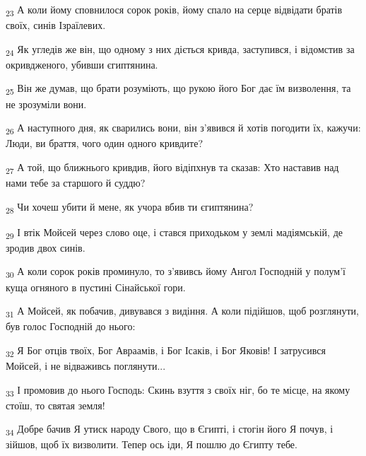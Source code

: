 \begin{tcolorbox}
\textsubscript{23} А коли йому сповнилося сорок років, йому спало на серце відвідати братів своїх, синів Ізраїлевих.
\end{tcolorbox}
\begin{tcolorbox}
\textsubscript{24} Як угледів же він, що одному з них діється кривда, заступився, і відомстив за окривдженого, убивши єгиптянина.
\end{tcolorbox}
\begin{tcolorbox}
\textsubscript{25} Він же думав, що брати розуміють, що рукою його Бог дає їм визволення, та не зрозуміли вони.
\end{tcolorbox}
\begin{tcolorbox}
\textsubscript{26} А наступного дня, як сварились вони, він з'явився й хотів погодити їх, кажучи: Люди, ви браття, чого один одного кривдите?
\end{tcolorbox}
\begin{tcolorbox}
\textsubscript{27} А той, що ближнього кривдив, його відіпхнув та сказав: Хто наставив над нами тебе за старшого й суддю?
\end{tcolorbox}
\begin{tcolorbox}
\textsubscript{28} Чи хочеш убити й мене, як учора вбив ти єгиптянина?
\end{tcolorbox}
\begin{tcolorbox}
\textsubscript{29} І втік Мойсей через слово оце, і стався приходьком у землі мадіямській, де зродив двох синів.
\end{tcolorbox}
\begin{tcolorbox}
\textsubscript{30} А коли сорок років проминуло, то з'явивсь йому Ангол Господній у полум'ї куща огняного в пустині Сінайської гори.
\end{tcolorbox}
\begin{tcolorbox}
\textsubscript{31} А Мойсей, як побачив, дивувався з видіння. А коли підійшов, щоб розглянути, був голос Господній до нього:
\end{tcolorbox}
\begin{tcolorbox}
\textsubscript{32} Я Бог отців твоїх, Бог Авраамів, і Бог Ісаків, і Бог Яковів! І затрусився Мойсей, і не відваживсь поглянути...
\end{tcolorbox}
\begin{tcolorbox}
\textsubscript{33} І промовив до нього Господь: Скинь взуття з своїх ніг, бо те місце, на якому стоїш, то святая земля!
\end{tcolorbox}
\begin{tcolorbox}
\textsubscript{34} Добре бачив Я утиск народу Свого, що в Єгипті, і стогін його Я почув, і зійшов, щоб їх визволити. Тепер ось іди, Я пошлю до Єгипту тебе.
\end{tcolorbox}
